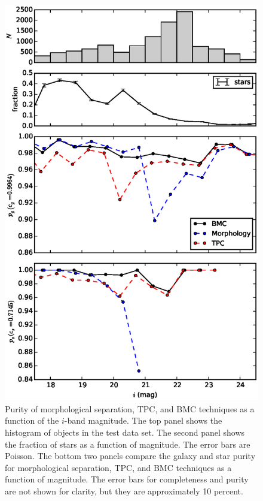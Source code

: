 \documentclass[useAMS,usenatbib]{mn2e}
\begin{document}
\begin{figure}
  \centering
  \includegraphics[width=\linewidth]{figures/purity_mag.eps}
  \caption{Purity of morphological separation,
           TPC, and BMC techniques
           as a function of the $i$-band magnitude.
           The top panel shows the histogram of objects in the test data set.
           The second panel shows the fraction of stars
           as a function of magnitude. The error bars are Poisson.
           The bottom two panels compare
           the galaxy and star purity for morphological separation, TPC,
           and BMC techniques as a function of magnitude.
           The error bars for completeness and purity are not shown for
           clarity, but they are approximately 10 percent.}
  \label{fig:purity_mag}
\end{figure}
\end{document}
